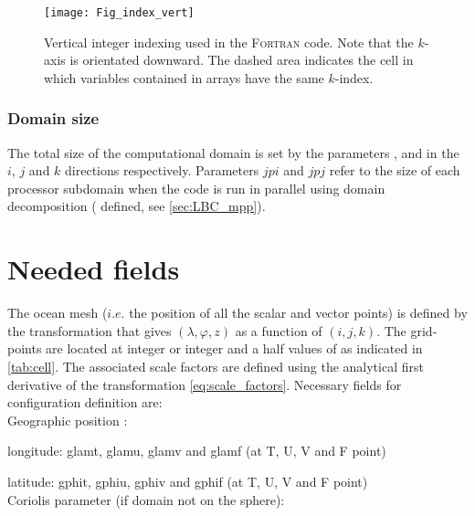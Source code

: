 \documentclass[../main/NEMO_manual]{subfiles}
\begin{document}
\begin{figure}[!pt]
  \begin{center}
    \texttt{[image: Fig\_index\_vert]}
    \caption{
      \protect\label{fig:index_vert}
      Vertical integer indexing used in the \textsc{Fortran } code.
      Note that the $k$-axis is orientated downward.
      The dashed area indicates the cell in which variables contained in arrays have the same $k$-index.
    }
  \end{center}
\end{figure}

\subsubsection{Domain size}
\label{subsec:DOM_size}

The total size of the computational domain is set by the parameters ,
 and  in the $i$, $j$ and $k$ directions respectively.
Parameters $jpi$ and $jpj$ refer to the size of each processor subdomain when
the code is run in parallel using domain decomposition ( defined,
see \autoref{sec:LBC_mpp}).

\section{Needed fields}
\label{sec:DOM_fields}
The ocean mesh ($i.e.$ the position of all the scalar and vector points) is defined by the transformation that gives $(\lambda,\varphi,z)$ as a function of $(i,j,k)$.
The grid-points are located at integer or integer and a half values of as indicated in \autoref{tab:cell}.
The associated scale factors are defined using the analytical first derivative of the transformation
\autoref{eq:scale_factors}.
Necessary fields for configuration definition are: \\
Geographic position :

longitude: glamt, glamu, glamv and glamf (at T, U, V and F point)

latitude: gphit, gphiu, gphiv and gphif (at T, U, V and F point)\\
Coriolis parameter (if domain not on the sphere): 
\end{document}
